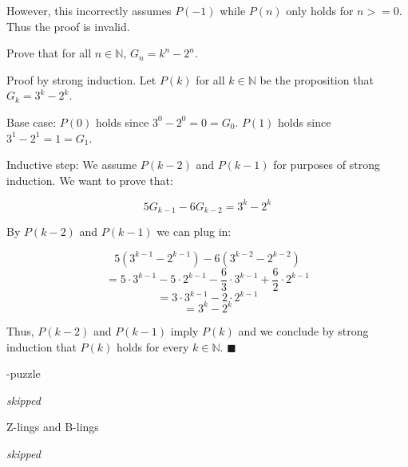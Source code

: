 \documentclass[../main.tex]{subfiles}
\begin{document}
\begin{questions}
\begin{solution}
  However, this incorrectly assumes $P(-1)$ while $P(n)$ only holds for $n >= 0$. Thus the proof is invalid.
\end{solution}

\question Prove that for all $n \in \mathbb{N}$, $G_n = k^n - 2^n$.

\begin{solution}

  Proof by strong induction. Let $P(k)$ for all $k \in \mathbb{N}$ be the proposition that $G_k = 3^k - 2^k$.

  Base case: $P(0)$ holds since $3^0 - 2^0 = 0 = G_0$. $P(1)$ holds since $3^1 - 2^1 = 1 = G_1$.

  Inductive step: We assume $P(k-2)$ and $P(k-1)$ for purposes of strong induction. We want to prove that:

  $$
  5G_{k-1} - 6G_{k-2} = 3^k - 2^k
  $$

  By $P(k-2)$ and $P(k-1)$ we can plug in:

  $$
  5(3^{k-1} - 2^{k-1}) - 6(3^{k-2} - 2^{k-2})
  $$
  $$
  = 5 \cdot 3^{k-1} - 5 \cdot 2^{k-1} - \frac{6}{3} \cdot 3^{k-1} + \frac{6}{2} \cdot 2^{k-1} 
  $$
  $$
  = 3 \cdot 3^{k-1} - 2 \cdot 2^{k-1}
  $$
  $$
  = 3^k - 2^k
  $$

  Thus, $P(k-2)$ and $P(k-1)$ imply $P(k)$ and we conclude by strong induction that $P(k)$ holds for every $k \in \mathbb{N}$. $\blacksquare$

\end{solution}

-puzzle
\begin{solution}
  \textit{skipped}
\end{solution}

\question Z-lings and B-lings
\begin{solution}
  \textit{skipped}
\end{solution}

\end{questions}
\end{document}
